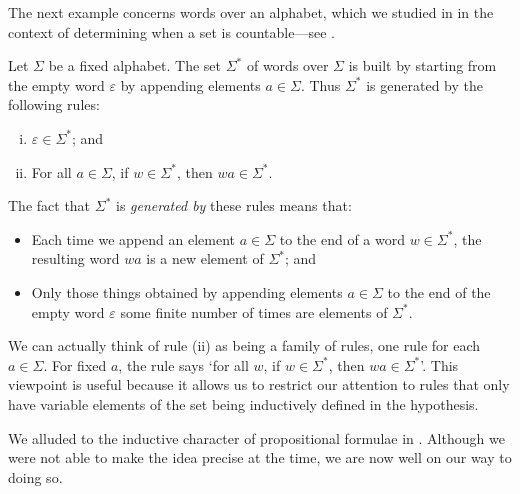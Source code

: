 The next example concerns words over an alphabet, which we studied in  in the context of determining when a set is countable---see .

\begin{example}
\label{exWordsAsInductivelyDefinedSetPreliminary}
Let $\Sigma$ be a fixed alphabet. The set $\Sigma^*$ of words over $\Sigma$ is built by starting from the empty word $\varepsilon$ by appending elements $a \in \Sigma$. Thus $\Sigma^*$ is generated by the following rules:
\begin{enumerate}[(i)]
\item $\varepsilon \in \Sigma^*$; and
\item For all $a \in \Sigma$, if $w \in \Sigma^*$, then $wa \in \Sigma^*$.
\end{enumerate}
The fact that $\Sigma^*$ is \textit{generated by} these rules means that:
\begin{itemize}
\item Each time we append an element $a \in \Sigma$ to the end of a word $w \in \Sigma^*$, the resulting word $wa$ is a new element of $\Sigma^*$; and
\item Only those things obtained by appending elements $a \in \Sigma$ to the end of the empty word $\varepsilon$ some finite number of times are elements of $\Sigma^*$.
\end{itemize}

We can actually think of rule (ii) as being a family of rules, one rule for each $a \in \Sigma$. For fixed $a$, the rule says `for all $w$, if $w \in \Sigma^*$, then $wa \in \Sigma^*$'. This viewpoint is useful because it allows us to restrict our attention to rules that only have variable elements of the set being inductively defined in the hypothesis.
\end{example}

We alluded to the inductive character of propositional formulae in . Although we were not able to make the idea precise at the time, we are now well on our way to doing so.

